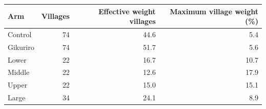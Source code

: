 \begin{tabular}{lrrr}
\toprule
Arm & Villages & Effective weight villages & Maximum village weight (\%) \\
\midrule
Control & 74 & 44.6 & 5.4 \\
Gikuriro & 74 & 51.7 & 5.6 \\
Lower & 22 & 16.7 & 10.7 \\
Middle & 22 & 12.6 & 17.9 \\
Upper & 22 & 15.0 & 15.1 \\
Large & 34 & 24.1 & 8.9 \\
\bottomrule
\end{tabular}

